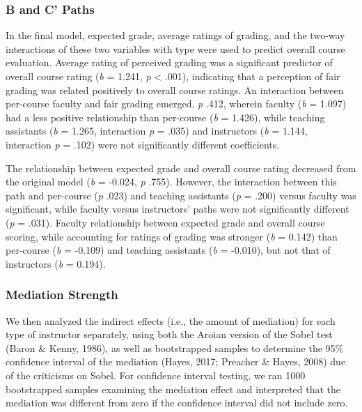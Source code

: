 \documentclass[man]{apa6}
\theoremstyle{definition}
\theoremstyle{definition}
\theoremstyle{definition}
\theoremstyle{remark}
\begin{document}
\subsubsection{B and C' Paths}\label{b-and-c-paths}

In the final model, expected grade, average ratings of grading, and the
two-way interactions of these two variables with type were used to
predict overall course evaluation. Average rating of perceived grading
was a significant predictor of overall course rating (\emph{b} = 1.241,
\emph{p} \textless{} .001), indicating that a perception of fair grading
was related positively to overall course ratings. An interaction between
per-course faculty and fair grading emerged, \emph{p} .412, wherein
faculty (\emph{b} = 1.097) had a less positive relationship than
per-course (\emph{b} = 1.426), while teaching assistants (\emph{b} =
1.265, interaction \emph{p} = .035) and instructors (\emph{b} = 1.144,
interaction \emph{p} = .102) were not significantly different
coefficients.

The relationship between expected grade and overall course rating
decreased from the original model (\emph{b} = -0.024, \emph{p} .755).
However, the interaction between this path and per-course (\emph{p}
.023) and teaching assistants (\emph{p} = .200) versus faculty was
significant, while faculty versus instructors' paths were not
significantly different (\emph{p} = .031). Faculty relationship between
expected grade and overall course scoring, while accounting for ratings
of grading was stronger (\emph{b} = 0.142) than per-course (\emph{b} =
-0.109) and teaching assistants (\emph{b} = -0.010), but not that of
instructors (\emph{b} = 0.194).

\subsubsection{Mediation Strength}\label{mediation-strength}

We then analyzed the indirect effects (i.e., the amount of mediation)
for each type of instructor separately, using both the Aroian version of
the Sobel test (Baron \& Kenny, 1986), as well as bootstrapped samples
to determine the 95\% confidence interval of the mediation (Hayes, 2017;
Preacher \& Hayes, 2008) due of the criticisms on Sobel. For confidence
interval testing, we ran 1000 bootstrapped samples examining the
mediation effect and interpreted that the mediation was different from
zero if the confidence interval did not include zero.
\end{document}
